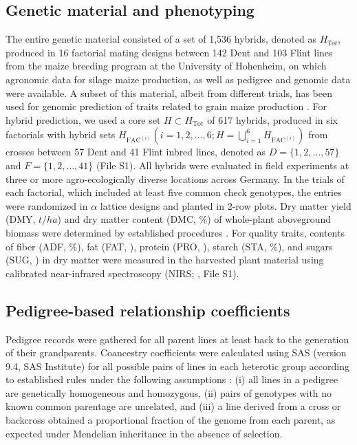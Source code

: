 \documentclass[12pt,titlepage]{article}
\begin{document}
\subsection{Genetic material and phenotyping}
The entire genetic material consisted of a set of 1,536 hybrids, denoted as 
$H_{Tot}$, produced in 16 factorial mating designs between 142 Dent and 103 
Flint lines from the maize breeding program at the University of Hohenheim, on 
which agronomic data for silage maize production, as well as pedigree and 
genomic data were available.
A subset of this material, albeit from different trials, has been used for
genomic prediction of traits related to grain maize production
\cite{Technow2014}.
For hybrid prediction, we used a core set $H \subset H_{\text{Tot}}$ of 617 
hybrids, produced in six factorials with hybrid sets $H_{\text{FAC}^{(i)}} (i =
1, 2, \dots, 6; H = \bigcup_{i=1}^{6} H_{\text{FAC}^{(i)}})$ from crosses 
between 57 Dent and 41 Flint inbred lines, denoted as $D = \{1, 2, \dots, 57 \}$ 
and $F = \{1, 2, \dots, 41 \}$ (File S1).
All hybrids were evaluated in field experiments at three or more 
agro-ecologically diverse locations across Germany.
In the trials of each factorial, which included at least five common check 
genotypes, the entries were randomized in $\alpha$ lattice designs and planted 
in 2-row plots.
Dry matter yield (DMY, $t/ha$) and dry matter content (DMC, \%) of whole-plant
aboveground biomass were determined by established procedures 
\cite{Riedelsheimer2012b}. 
For quality traits, contents of fiber (ADF, \%), fat (FAT, \textperthousand), 
protein (PRO, \textperthousand), starch (STA, \%), and sugars (SUG,
\textperthousand) in dry matter were measured in the harvested plant material 
using calibrated near-infrared spectroscopy (NIRS; , 
File S1).



\subsection{Pedigree-based relationship coefficients}
Pedigree records were gathered for all parent lines at least back to the 
generation of their grandparents.
Coancestry coefficients were calculated using SAS (version 9.4, SAS Institute) 
for all possible pairs of lines in each heterotic group according to established 
rules \cite{Falconer1996} under the following assumptions \cite{Cox1986}:
(i) all lines in a pedigree are genetically homogeneous and homozygous, (ii) 
pairs of genotypes with no known common parentage are unrelated, and (iii) a 
line derived from a cross or backcross obtained a proportional fraction of the 
genome from each parent, as expected under Mendelian inheritance in the absence 
of selection.
\end{document}
